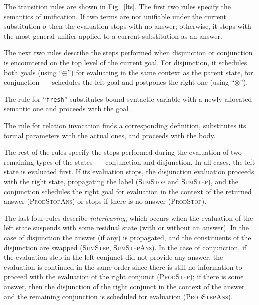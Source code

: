 The transition rules are shown in Fig.~\ref{lts}. The first two rules specify the semantics of unification. If two terms are not unifiable under the current substitution
$\sigma$ then the evaluation stops with no answer; otherwise, it stops with the most general unifier applied to a current substitution as an answer.

The next two rules describe the steps performed when disjunction or conjunction is encountered on the top level of the current goal. For disjunction, it schedules both goals (using ``$\oplus$'') for
evaluating in the same context as the parent state, for conjunction~--- schedules the left goal and postpones the right one (using ``$\otimes$'').

The rule for ``\lstinline|fresh|'' substitutes bound syntactic variable with a newly allocated semantic one and proceeds with the goal.

The rule for relation invocation finds a corresponding definition, substitutes its formal parameters with the actual ones, and proceeds with the body.

The rest of the rules specify the steps performed during the evaluation of two remaining types of the states~--- conjunction and disjunction. In all cases, the left state
is evaluated first. If its evaluation stops, the disjunction evaluation proceeds with the right state, propagating the label (\textsc{SumStop} and \textsc{SumStep}), and the conjunction schedules the right goal for evaluation in the context of the returned answer (\textsc{ProdStopAns}) or stops if there is no answer (\textsc{ProdStop}).

The last four rules describe \emph{interleaving}, which occurs when the evaluation of the left state suspends with some residual state (with or without an answer). In the case of disjunction
the answer (if any) is propagated, and the constituents of the disjunction are swapped (\textsc{SumStep}, \textsc{SumStepAns}). In the case of conjunction, if the evaluation step in
the left conjunct did not provide any answer, the evaluation is continued in the same order since there is still no information to proceed with the evaluation of the right
conjunct (\textsc{ProdStep}); if there is some answer, then the disjunction of the right conjunct in the context of the answer and the remaining conjunction is
scheduled for evaluation (\textsc{ProdStepAns}).


